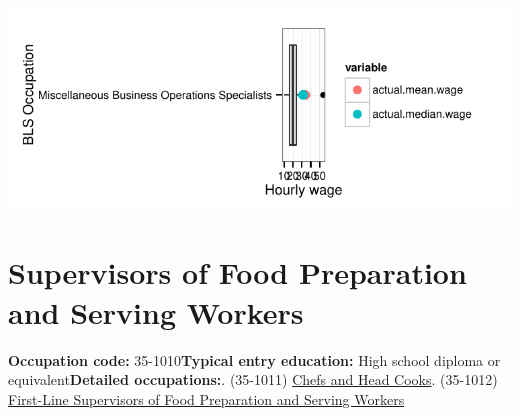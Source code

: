 \documentclass[a4paper,10pt]{article}\usepackage[]{graphicx}\usepackage[]{color}
\makeatletter
\def\maxwidth{ %
  \ifdim\Gin@nat@width>\linewidth
    \linewidth
  \else
    \Gin@nat@width
  \fi
}
\makeatother
\begin{document}
{\centering \includegraphics[width=\maxwidth]{figure/unnamed-chunk-231} 

}


\newpage\section{Supervisors of Food Preparation and Serving Workers}\textbf{Occupation code:} 35-1010\newline\textbf{Typical entry education:} High school diploma or equivalent\newline\textbf{Detailed occupations:}. (35-1011)  \href{http://www.bls.gov/oes/current/oes351011.htm}{Chefs and Head Cooks}. (35-1012)  \href{http://www.bls.gov/oes/current/oes351012.htm}{First-Line Supervisors of Food Preparation and Serving Workers}\newline%
\end{document}
